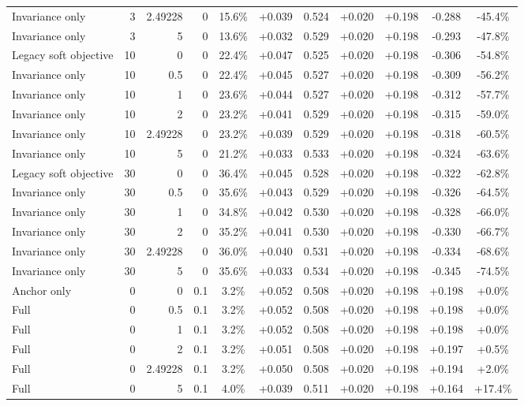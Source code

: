 \begin{table}[htbp]
\begin{tabular}{lrrrccccccc}
Invariance only & 3 & 2.49228 & 0 & 15.6\% & +0.039 & 0.524 & +0.020 & +0.198 & -0.288 & -45.4\% \\
Invariance only & 3 & 5 & 0 & 13.6\% & +0.032 & 0.529 & +0.020 & +0.198 & -0.293 & -47.8\% \\
Legacy soft objective & 10 & 0 & 0 & 22.4\% & +0.047 & 0.525 & +0.020 & +0.198 & -0.306 & -54.8\% \\
Invariance only & 10 & 0.5 & 0 & 22.4\% & +0.045 & 0.527 & +0.020 & +0.198 & -0.309 & -56.2\% \\
Invariance only & 10 & 1 & 0 & 23.6\% & +0.044 & 0.527 & +0.020 & +0.198 & -0.312 & -57.7\% \\
Invariance only & 10 & 2 & 0 & 23.2\% & +0.041 & 0.529 & +0.020 & +0.198 & -0.315 & -59.0\% \\
Invariance only & 10 & 2.49228 & 0 & 23.2\% & +0.039 & 0.529 & +0.020 & +0.198 & -0.318 & -60.5\% \\
Invariance only & 10 & 5 & 0 & 21.2\% & +0.033 & 0.533 & +0.020 & +0.198 & -0.324 & -63.6\% \\
Legacy soft objective & 30 & 0 & 0 & 36.4\% & +0.045 & 0.528 & +0.020 & +0.198 & -0.322 & -62.8\% \\
Invariance only & 30 & 0.5 & 0 & 35.6\% & +0.043 & 0.529 & +0.020 & +0.198 & -0.326 & -64.5\% \\
Invariance only & 30 & 1 & 0 & 34.8\% & +0.042 & 0.530 & +0.020 & +0.198 & -0.328 & -66.0\% \\
Invariance only & 30 & 2 & 0 & 35.2\% & +0.041 & 0.530 & +0.020 & +0.198 & -0.330 & -66.7\% \\
Invariance only & 30 & 2.49228 & 0 & 36.0\% & +0.040 & 0.531 & +0.020 & +0.198 & -0.334 & -68.6\% \\
Invariance only & 30 & 5 & 0 & 35.6\% & +0.033 & 0.534 & +0.020 & +0.198 & -0.345 & -74.5\% \\
Anchor only & 0 & 0 & 0.1 & 3.2\% & +0.052 & 0.508 & +0.020 & +0.198 & +0.198 & +0.0\% \\
Full & 0 & 0.5 & 0.1 & 3.2\% & +0.052 & 0.508 & +0.020 & +0.198 & +0.198 & +0.0\% \\
Full & 0 & 1 & 0.1 & 3.2\% & +0.052 & 0.508 & +0.020 & +0.198 & +0.198 & +0.0\% \\
Full & 0 & 2 & 0.1 & 3.2\% & +0.051 & 0.508 & +0.020 & +0.198 & +0.197 & +0.5\% \\
Full & 0 & 2.49228 & 0.1 & 3.2\% & +0.050 & 0.508 & +0.020 & +0.198 & +0.194 & +2.0\% \\
Full & 0 & 5 & 0.1 & 4.0\% & +0.039 & 0.511 & +0.020 & +0.198 & +0.164 & +17.4\% \\

\end{tabular}
\end{table}
